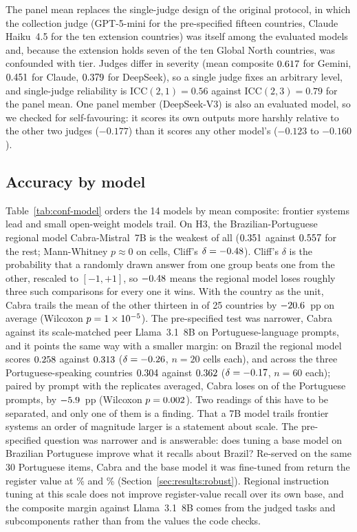 The panel mean replaces the single-judge design of the original protocol, in
which the collection judge (GPT-5-mini for the pre-specified fifteen countries,
Claude Haiku~4.5 for the ten extension countries) was itself among the
evaluated models and, because the extension holds seven of the ten Global North
countries, was confounded with tier. Judges differ in severity (mean composite
$0.617$ for Gemini, $0.451$ for Claude, $0.379$ for
DeepSeek), so a single judge fixes an arbitrary level, and single-judge
reliability is ICC$(2,1)=0.56$ against ICC$(2,3)=0.79$ for the panel mean. One
panel member (DeepSeek-V3) is also an evaluated model, so we checked for
self-favouring: it scores its own outputs more harshly relative to the other
two judges ($-0.177$) than it scores any other model's ($-0.123$ to $-0.160$).

\subsection{Accuracy by model}
\label{sec:results:model}

Table~\ref{tab:conf-model} orders the 14 models by mean composite: frontier
systems lead and small open-weight models trail. On H3, the Brazilian-Portuguese
regional model Cabra-Mistral~7B is the weakest of all ($0.351$ against
$0.557$ for the rest; Mann-Whitney $p\approx 0$ on cells, Cliff's
$\delta=-0.48$). Cliff's $\delta$ is the probability that a randomly drawn
answer from one group beats one from the other, rescaled to $[-1,+1]$, so
$-0.48$ means the regional model loses roughly three such comparisons for
every one it wins. With the country as the unit, Cabra trails the mean of the
other thirteen in \nhthreebyctryneg{} of 25 countries by $-20.6$~pp
on average (Wilcoxon $p=1\times10^{-5}$). The pre-specified test was narrower,
Cabra against its scale-matched peer Llama~3.1~8B on Portuguese-language
prompts, and it points the same way with a smaller margin: on Brazil the
regional model scores $0.258$ against $0.313$
($\delta=-0.26$, $n=20$ cells each), and across the three
Portuguese-speaking countries $0.304$ against $0.362$
($\delta=-0.17$, $n=60$ each); paired by prompt with the replicates
averaged, Cabra loses on \nhthreenarrowneg{} of the \nhthreenarrown{}
Portuguese prompts, by $-5.9$~pp (Wilcoxon $p=0.002$).
Two readings of this have to be separated, and only one of them is a
finding. That a 7B model trails frontier systems an order of magnitude larger is
a statement about scale. The pre-specified question was narrower and is
answerable: does tuning a base model on Brazilian Portuguese improve what it
recalls about Brazil? Re-served on the same 30 Portuguese items, Cabra and the
base model it was fine-tuned from return the register value at
\ncabsanitycabra\% and \ncabsanitybase\% (Section~\ref{sec:results:robust}).
Regional instruction tuning at this scale does not improve register-value
recall over its own base, and the composite margin against Llama~3.1~8B comes
from the judged tasks and subcomponents rather than from the values the code
checks.

